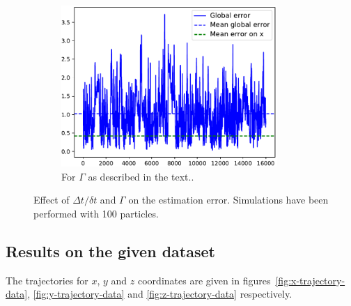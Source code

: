 \documentclass[english, DIV=13]{scrartcl}
\begin{document}
\begin{figure}
\begin{subfigure}{0.49\textwidth}
        \includegraphics[width=0.9\textwidth]{figures/error-100-gamma}
        \caption{For $\Gamma$ as described in the text..} 
        \label{fig:error-gamma}
    \end{subfigure}
    \caption{Effect of $\Delta t/\delta t$ and $\Gamma$ on the estimation error. Simulations
    have been performed with 100 particles.}
\end{figure}

\subsection{Results on the given dataset}
The trajectories for $x$, $y$ and $z$ coordinates are given in
figures~\ref{fig:x-trajectory-data}, \ref{fig:y-trajectory-data} and
\ref{fig:z-trajectory-data} respectively.
\end{document}

